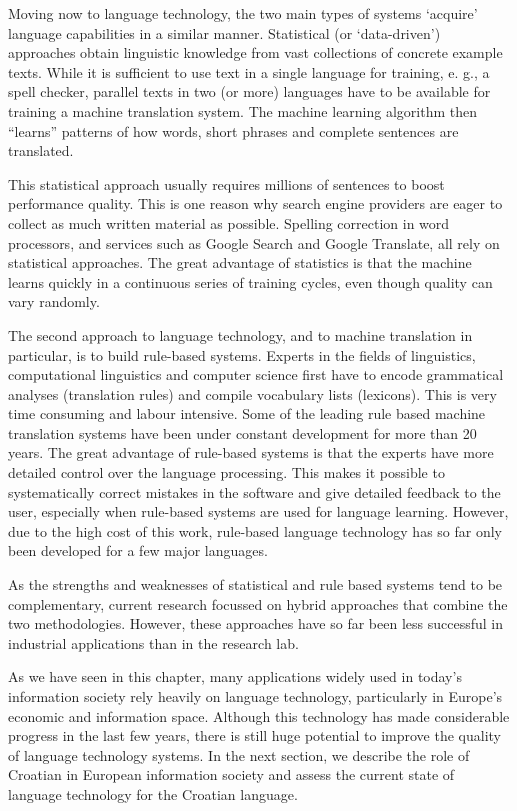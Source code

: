 \begin{multicols}{2}
Moving now to language technology, the two main types of systems ‘acquire’ language capabilities in a similar manner. Statistical (or ‘data-driven’) approaches obtain linguistic knowledge from vast collections of concrete example texts. While it is sufficient to use text in a single language for training, e. g., a spell checker, parallel texts in two (or more) languages have to be available for training a machine translation system. The machine learning algorithm then “learns” patterns of how words, short phrases and complete sentences are translated. 

This statistical approach usually requires millions of sentences to boost performance quality. This is one reason why search engine providers are eager to collect as much written material as possible. Spelling correction in word processors, and services such as Google Search and Google Translate, all rely on statistical approaches. The great advantage of statistics is that the machine learns quickly in a continuous series of training cycles, even though quality can vary randomly.

The second approach to language technology, and to machine translation in particular, is to build rule-based systems. Experts in the fields of linguistics, computational linguistics and computer science first have to encode grammatical analyses (translation rules) and compile vocabulary lists (lexicons). This is very time consuming and labour intensive. Some of the leading rule based machine translation systems have been under constant development for more than 20 years. The great advantage of rule-based systems is that the experts have more detailed control over the language processing. This makes it possible to systematically correct mistakes in the software and give detailed feedback to the user, especially when rule-based systems are used for language learning. However, due to the high cost of this work, rule-based language technology has so far only been developed for a few major languages.


As the strengths and weaknesses of statistical and rule based systems tend to be complementary, current research focussed on hybrid approaches that combine the two methodologies. However, these approaches have so far been less successful in industrial applications than in the research lab. 

As we have seen in this chapter, many applications widely used in today’s information society rely heavily on language technology, particularly in Europe’s economic and information space. Although this technology has made considerable progress in the last few years, there is still huge potential to improve the quality of language technology systems. In the next section, we describe the role of Croatian in European information society and assess the current state of language technology for the Croatian language.

\end{multicols}

